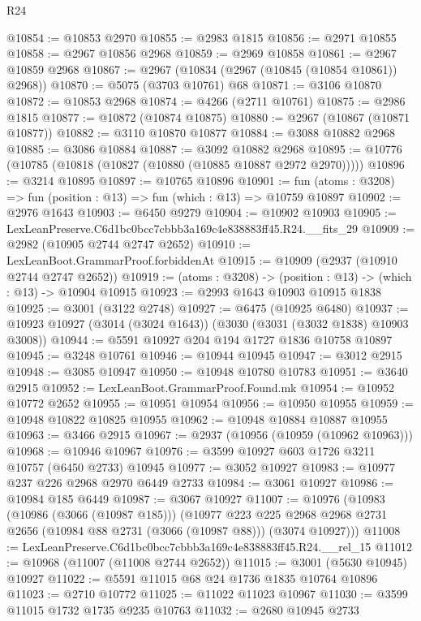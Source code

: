 \begin{lexlean}{R24}
\begin{coremodule}
@10854 := @10853 @2970
@10855 := @2983 @1815
@10856 := @2971 @10855
@10858 := @2967 @10856 @2968
@10859 := @2969 @10858
@10861 := @2967 @10859 @2968
@10867 := @2967 (@10834 (@2967 (@10845 (@10854 @10861)) @2968))
@10870 := @5075 (@3703 @10761) @68
@10871 := @3106 @10870
@10872 := @10853 @2968
@10874 := @4266 (@2711 @10761)
@10875 := @2986 @1815
@10877 := @10872 (@10874 @10875)
@10880 := @2967 (@10867 (@10871 @10877))
@10882 := @3110 @10870 @10877
@10884 := @3088 @10882 @2968
@10885 := @3086 @10884
@10887 := @3092 @10882 @2968
@10895 := @10776 (@10785 (@10818 (@10827 (@10880 (@10885 @10887 @2972 @2970)))))
@10896 := @3214 @10895
@10897 := @10765 @10896
@10901 := fun (atoms : @3208) => fun (position : @13) => fun (which : @13) => @10759 @10897
@10902 := @2976 @1643
@10903 := @6450 @9279
@10904 := @10902 @10903
@10905 := LexLeanPreserve.C6d1bc0bcc7cbbb3a169c4e838883ff45.R24.__fits_29
@10909 := @2982 (@10905 @2744 @2747 @2652)
@10910 := LexLeanBoot.GrammarProof.forbiddenAt
@10915 := @10909 (@2937 (@10910 @2744 @2747 @2652))
@10919 := (atoms : @3208) -> (position : @13) -> (which : @13) -> @10904 @10915
@10923 := @2993 @1643 @10903 @10915 @1838
@10925 := @3001 (@3122 @2748)
@10927 := @6475 (@10925 @6480)
@10937 := @10923 @10927 (@3014 (@3024 @1643)) (@3030 (@3031 (@3032 @1838) @10903 @3008))
@10944 := @5591 @10927 @204 @194 @1727 @1836 @10758 @10897
@10945 := @3248 @10761
@10946 := @10944 @10945
@10947 := @3012 @2915
@10948 := @3085 @10947
@10950 := @10948 @10780 @10783
@10951 := @3640 @2915
@10952 := LexLeanBoot.GrammarProof.Found.mk
@10954 := @10952 @10772 @2652
@10955 := @10951 @10954
@10956 := @10950 @10955
@10959 := @10948 @10822 @10825 @10955
@10962 := @10948 @10884 @10887 @10955
@10963 := @3466 @2915
@10967 := @2937 (@10956 (@10959 (@10962 @10963)))
@10968 := @10946 @10967
@10976 := @3599 @10927 @603 @1726 @3211 @10757 (@6450 @2733) @10945
@10977 := @3052 @10927
@10983 := @10977 @237 @226 @2968 @2970 @6449 @2733
@10984 := @3061 @10927
@10986 := @10984 @185 @6449
@10987 := @3067 @10927
@11007 := @10976
    (@10983
      (@10986 (@3066 (@10987 @185)))
      (@10977
        @223
        @225
        @2968
        @2968
        @2731
        @2656
        (@10984 @88 @2731 (@3066 (@10987 @88)))
        (@3074 @10927)))
@11008 := LexLeanPreserve.C6d1bc0bcc7cbbb3a169c4e838883ff45.R24.__rel_15
@11012 := @10968 (@11007 (@11008 @2744 @2652))
@11015 := @3001 (@5630 @10945) @10927
@11022 := @5591 @11015 @68 @24 @1736 @1835 @10764 @10896
@11023 := @2710 @10772
@11025 := @11022 @11023 @10967
@11030 := @3599 @11015 @1732 @1735 @9235 @10763
@11032 := @2680 @10945 @2733

\end{coremodule}
\end{lexlean}
